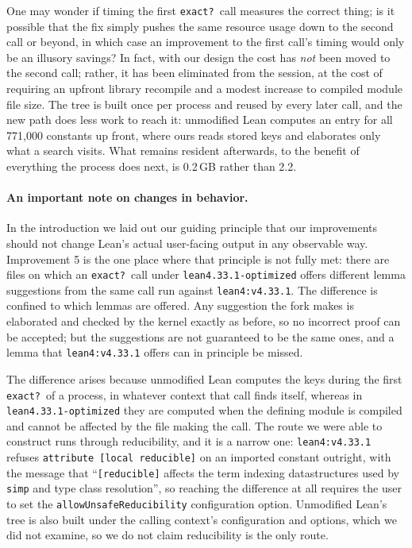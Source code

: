 \documentclass{article}
\newcommand{\Lean}{Lean\xspace}      %
\newcommand{\currentlean}{\texttt{lean4:v4.33.1}\xspace}
\newcommand{\altlean}{\texttt{lean4.33.1-\allowbreak optimized}\xspace}
\begin{document}
One may wonder if timing the first \texttt{exact?}\ call measures the correct thing; is it possible that the fix simply pushes the same resource usage down to the second call or beyond, in which case an improvement to the first call's timing would only be an illusory savings? In fact, with our design the cost has \emph{not} been moved to the second call; rather, it has been eliminated from the session, at the cost of requiring an upfront library recompile and a modest increase to compiled module file size. The tree is built once per process and reused by every later call, and the new path does less work to reach it: unmodified \Lean computes an entry for all 771{,}000 constants up front, where ours reads stored keys and elaborates only what a search visits. What remains resident afterwards, to the benefit of everything the process does next, is 0.2\,GB rather than 2.2.

\paragraph{An important note on changes in behavior.} In the introduction we laid out our guiding principle that our improvements should not change \Lean's actual user-facing output in any observable way. Improvement 5 is the one place where that principle is not fully met: there are files on which an \texttt{exact?}\ call under \altlean offers different lemma suggestions from the same call run against \currentlean. The difference is confined to which lemmas are offered. Any suggestion the fork makes is elaborated and checked by the kernel exactly as before, so no incorrect proof can be accepted; but the suggestions are not guaranteed to be the same ones, and a lemma that \currentlean offers can in principle be missed.

The difference arises because unmodified \Lean computes the keys during the first \texttt{exact?}\ of a process, in whatever context that call finds itself, whereas in \altlean they are computed when the defining module is compiled and cannot be affected by the file making the call. The route we were able to construct runs through reducibility, and it is a narrow one: \currentlean refuses \texttt{attribute [local reducible]} on an imported constant outright, with the message that ``\texttt{[reducible]} affects the term indexing datastructures used by \texttt{simp} and type class resolution'', so reaching the difference at all requires the user to set the \texttt{allowUnsafeReducibility} configuration option. Unmodified \Lean's tree is also built under the calling context's configuration and options, which we did not examine, so we do not claim reducibility is the only route.
\end{document}
